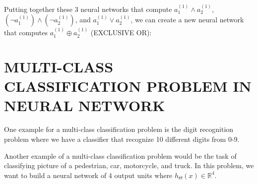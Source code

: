 \documentclass[12pt]{article}
\begin{document}
	Putting together these 3 neural networks that compute $a_1^{(1)}\wedge a_2^{(1)}$, $(\neg a_1^{(1)})\wedge (\neg a_2^{(1)})$, and $a_1^{(1)}\vee a_2^{(1)}$, we can create a new neural network that computes  $a_1^{(1)}\oplus a_2^{(1)}$ (EXCLUSIVE OR):
	
	\section*{MULTI-CLASS CLASSIFICATION PROBLEM IN NEURAL NETWORK}
	
	One example for a multi-class classification problem is the digit recognition problem where we have a classifier that recognize 10 different digits from 0-9. 
	
	Another example of a multi-class classification problem would be the task of classifying picture of a pedestrian, car, motorcycle, and truck. In this problem, we want to build a neural network of 4 output units where $h_\Theta (x) \in \mathbb{R}^4 $.
	
\end{document}
